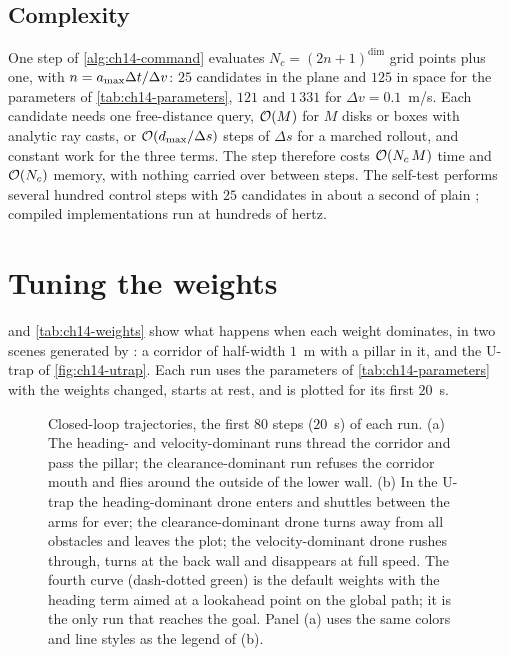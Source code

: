 \subsection{Complexity}

One step of \cref{alg:ch14-command} evaluates $N_c = (2n+1)^{\dim}$ grid
points plus one, with $n = a_{\max}\Delta t/\Delta v$: $25$ candidates in the plane
and $125$ in space for the parameters of \cref{tab:ch14-parameters}, $121$
and $1\,331$ for $\Delta v = 0.1$~m/s. Each candidate needs one free-distance
query, $\mathcal{O}\!\left(M\right)$ for $M$ disks or boxes with analytic ray casts, or
$\mathcal{O}\!\left(d_{\max}/\Delta s\right)$ steps of $\Delta s$ for a marched rollout, and
constant work for the three terms. The step therefore costs
$\mathcal{O}\!\left(N_c\,M\right)$ time and $\mathcal{O}\!\left(N_c\right)$ memory, with nothing carried over
between steps. The self-test performs several hundred
control steps with $25$ candidates in about a second of plain \python;
compiled implementations run at hundreds of hertz.

\section{Tuning the weights}
\label{sec:ch14-tuning}

 and \cref{tab:ch14-weights} show what happens
when each weight dominates, in two scenes generated by
: a corridor of half-width $1$~m with a pillar in
it, and the U-trap of \cref{fig:ch14-utrap}. Each run uses the parameters of
\cref{tab:ch14-parameters} with the weights changed, starts at rest, and is
plotted for its first $20$~s.

\begin{figure}[tb]
  \centering
  \caption{Closed-loop trajectories, the first $80$ steps ($20$~s) of each
  run. (a) The heading- and velocity-dominant runs thread the corridor and
  pass the pillar; the clearance-dominant run refuses the corridor mouth and
  flies around the outside of the lower wall. (b) In the U-trap the
  heading-dominant drone enters and shuttles between the arms for ever; the
  clearance-dominant drone turns away from all obstacles and leaves the plot;
  the velocity-dominant drone rushes through, turns at the back wall and
  disappears at full speed. The fourth curve (dash-dotted green) is the
  default weights with the heading term aimed at a lookahead point on the
  global path; it is the only run that reaches the goal. Panel (a) uses the
  same colors and line styles as the legend of (b).}
  \label{fig:ch14-experiment}
\end{figure}

